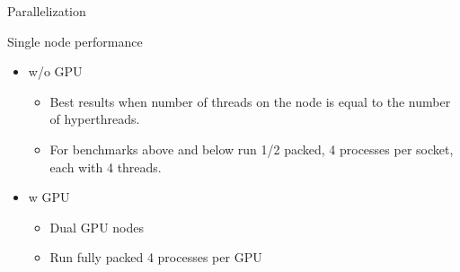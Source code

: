 \documentclass[notes]{beamer}
\begin{document}
\begin{frame}{Parallelization}
    \begin{beamerboxesrounded}{Single node performance}
    \begin{minipage}{\linewidth}
    \vspace{0pt}
    \begin{center}
    \hspace{0.05in}
    \hspace{0.05in}
    \end{center}
    \end{minipage}
    \vspace{-0.05in}
    \begin{itemize}
    \setlength{\itemindent}{-1em}
    \scriptsize
    \item w/o GPU
    \begin{itemize}
    \setlength{\itemindent}{-3em}
    \scriptsize
    \item Best results when number of threads on the node is equal to the number of hyperthreads.
    \item For benchmarks above and below  run 1/2 packed, 4 processes per socket, each with 4 threads.
    \end{itemize}
    \item w GPU
    \begin{itemize}
    \setlength{\itemindent}{-3em}
    \scriptsize
    \item Dual GPU nodes
    \item Run fully packed 4 processes per GPU
    \end{itemize}
    \end{itemize}
    \end{beamerboxesrounded}
\end{frame}
\end{document}
